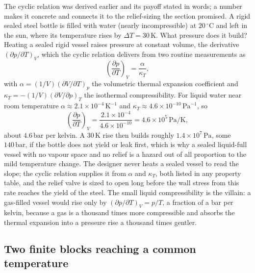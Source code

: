 The cyclic relation was derived earlier and its payoff stated in words; a number
makes it concrete and connects it to the relief-sizing the section promised. A
rigid sealed steel bottle is filled with water (nearly incompressible) at
$20\,^{\circ}\mathrm{C}$ and left in the sun, where its temperature rises by
$\Delta T = 30\,\si{\kelvin}$. What pressure does it build? Heating a sealed rigid
vessel raises pressure at constant volume, the derivative $(\partial p/\partial
T)_V$, which the cyclic relation delivers from two routine measurements as
\[
\left(\frac{\partial p}{\partial T}\right)_V = \frac{\alpha}{\kappa_T},
\]
with $\alpha = (1/V)(\partial V/\partial T)_p$ the volumetric thermal expansion
coefficient and $\kappa_T = -(1/V)(\partial V/\partial p)_T$ the isothermal
compressibility. For liquid water near room temperature $\alpha \approx
2.1 \times 10^{-4}\,\si{\kelvin}^{-1}$ and $\kappa_T \approx 4.6 \times
10^{-10}\,\text{Pa}^{-1}$, so
\[
\left(\frac{\partial p}{\partial T}\right)_V = \frac{2.1\times 10^{-4}}
{4.6\times 10^{-10}} = 4.6 \times 10^{5}\,\text{Pa}/\si{\kelvin},
\]
about $4.6\,\text{bar}$ per kelvin. A $30\,\si{\kelvin}$ rise then builds roughly
$1.4 \times 10^{7}\,\text{Pa}$, some $140\,\text{bar}$, if the bottle does not
yield or leak first, which is why a sealed liquid-full vessel with no vapour space
and no relief is a hazard out of all proportion to the mild temperature change.
The designer never heats a sealed vessel to read the slope; the cyclic relation
supplies it from $\alpha$ and $\kappa_T$, both listed in any property table, and
the relief valve is sized to open long before the wall stress from this rate
reaches the yield of the steel. The small liquid compressibility is the villain:
a gas-filled vessel would rise only by $(\partial p/\partial T)_V = p/T$, a
fraction of a bar per kelvin, because a gas is a thousand times more compressible
and absorbs the thermal expansion into a pressure rise a thousand times gentler.

\subsection{Two finite blocks reaching a common temperature}

